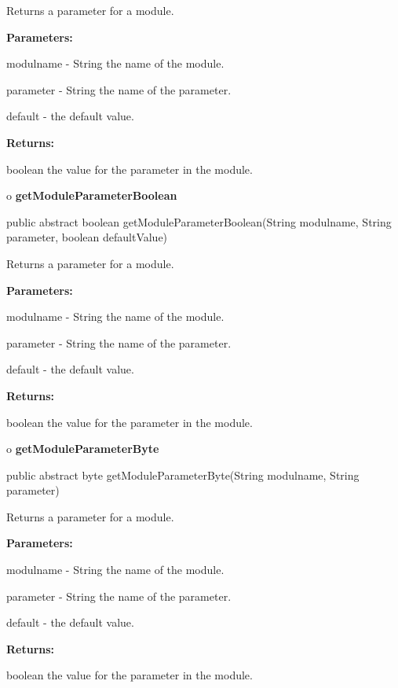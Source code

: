\begin{description}
\htmlDD Returns a parameter for a module. 

\begin{description}
\item {\bf Parameters:}  

modulname - String the name of the module.  

parameter - String the name of the parameter.  

default - the default value.  
\item {\bf Returns:}  

boolean the value for the parameter in the module.  
\end{description}

\end{description}

o {\bf getModuleParameterBoolean} 

\begin{PRE}
 public abstract boolean getModuleParameterBoolean(String modulname,
                                                   String parameter,
                                                   boolean defaultValue)
\end{PRE}

\begin{description}
\htmlDD Returns a parameter for a module. 

\begin{description}
\item {\bf Parameters:}  

modulname - String the name of the module.  

parameter - String the name of the parameter.  

default - the default value.  
\item {\bf Returns:}  

boolean the value for the parameter in the module.  
\end{description}

\end{description}

o {\bf getModuleParameterByte} 

\begin{PRE}
 public abstract byte getModuleParameterByte(String modulname,
                                             String parameter)
\end{PRE}

\begin{description}
\htmlDD Returns a parameter for a module. 

\begin{description}
\item {\bf Parameters:}  

modulname - String the name of the module.  

parameter - String the name of the parameter.  

default - the default value.  
\item {\bf Returns:}  

boolean the value for the parameter in the module.  
\end{description}

\end{description}

